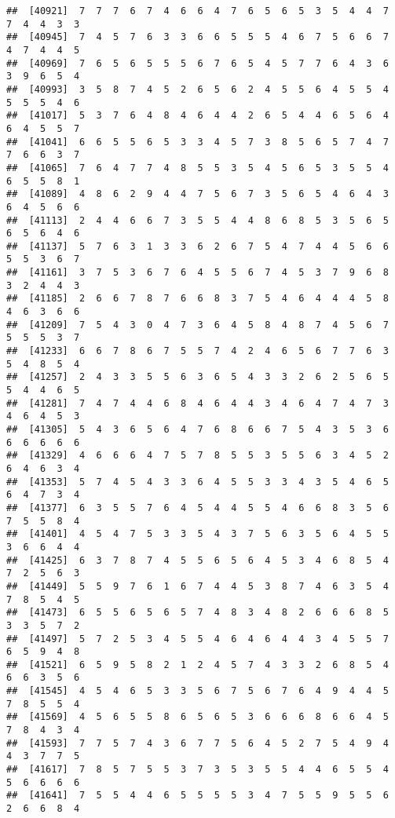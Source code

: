 \documentclass[
]{book}
\begin{document}
\begin{verbatim}
##  [40921]  7  7  7  6  7  4  6  6  4  7  6  5  6  5  3  5  4  4  7  7  4  4  3  3
##  [40945]  7  4  5  7  6  3  3  6  6  5  5  5  4  6  7  5  6  6  7  4  7  4  4  5
##  [40969]  7  6  5  6  5  5  5  6  7  6  5  4  5  7  7  6  4  3  6  3  9  6  5  4
##  [40993]  3  5  8  7  4  5  2  6  5  6  2  4  5  5  6  4  5  5  4  5  5  5  4  6
##  [41017]  5  3  7  6  4  8  4  6  4  4  2  6  5  4  4  6  5  6  4  6  4  5  5  7
##  [41041]  6  6  5  5  6  5  3  3  4  5  7  3  8  5  6  5  7  4  7  7  6  6  3  7
##  [41065]  7  6  4  7  7  4  8  5  5  3  5  4  5  6  5  3  5  5  4  6  5  5  8  1
##  [41089]  4  8  6  2  9  4  4  7  5  6  7  3  5  6  5  4  6  4  3  6  4  5  6  6
##  [41113]  2  4  4  6  6  7  3  5  5  4  4  8  6  8  5  3  5  6  5  6  5  6  4  6
##  [41137]  5  7  6  3  1  3  3  6  2  6  7  5  4  7  4  4  5  6  6  5  5  3  6  7
##  [41161]  3  7  5  3  6  7  6  4  5  5  6  7  4  5  3  7  9  6  8  3  2  4  4  3
##  [41185]  2  6  6  7  8  7  6  6  8  3  7  5  4  6  4  4  4  5  8  4  6  3  6  6
##  [41209]  7  5  4  3  0  4  7  3  6  4  5  8  4  8  7  4  5  6  7  5  5  5  3  7
##  [41233]  6  6  7  8  6  7  5  5  7  4  2  4  6  5  6  7  7  6  3  5  4  8  5  4
##  [41257]  2  4  3  3  5  5  6  3  6  5  4  3  3  2  6  2  5  6  5  5  4  4  6  5
##  [41281]  7  4  7  4  4  6  8  4  6  4  4  3  4  6  4  7  4  7  3  4  6  4  5  3
##  [41305]  5  4  3  6  5  6  4  7  6  8  6  6  7  5  4  3  5  3  6  6  6  6  6  6
##  [41329]  4  6  6  6  4  7  5  7  8  5  5  3  5  5  6  3  4  5  2  6  4  6  3  4
##  [41353]  5  7  4  5  4  3  3  6  4  5  5  3  3  4  3  5  4  6  5  6  4  7  3  4
##  [41377]  6  3  5  5  7  6  4  5  4  4  5  5  4  6  6  8  3  5  6  7  5  5  8  4
##  [41401]  4  5  4  7  5  3  3  5  4  3  7  5  6  3  5  6  4  5  5  3  6  6  4  4
##  [41425]  6  3  7  8  7  4  5  5  6  5  6  4  5  3  4  6  8  5  4  7  2  5  6  3
##  [41449]  5  5  9  7  6  1  6  7  4  4  5  3  8  7  4  6  3  5  4  7  8  5  4  5
##  [41473]  6  5  5  6  5  6  5  7  4  8  3  4  8  2  6  6  6  8  5  3  3  5  7  2
##  [41497]  5  7  2  5  3  4  5  5  4  6  4  6  4  4  3  4  5  5  7  6  5  9  4  8
##  [41521]  6  5  9  5  8  2  1  2  4  5  7  4  3  3  2  6  8  5  4  6  6  3  5  6
##  [41545]  4  5  4  6  5  3  3  5  6  7  5  6  7  6  4  9  4  4  5  7  8  5  5  4
##  [41569]  4  5  6  5  5  8  6  5  6  5  3  6  6  6  8  6  6  4  5  7  8  4  3  4
##  [41593]  7  7  5  7  4  3  6  7  7  5  6  4  5  2  7  5  4  9  4  4  3  7  7  5
##  [41617]  7  8  5  7  5  5  3  7  3  5  3  5  5  4  4  6  5  5  4  5  6  6  6  6
##  [41641]  7  5  5  4  4  6  5  5  5  5  3  4  7  5  5  9  5  5  6  2  6  6  8  4

\end{verbatim}
\end{document}
